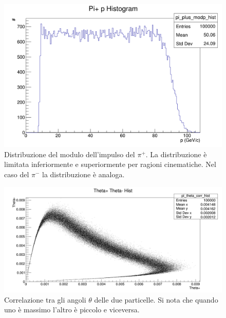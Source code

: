 \documentclass[8pt]{extarticle}
\begin{document}
\begin{figure}
	\begin{center}
		\includegraphics[scale=0.3]{gen_p} 
		\caption{Distribuzione del modulo dell'impulso del $\pi^+$. La distribuzione è limitata inferiormente e superiormente per ragioni cinematiche. Nel caso del $\pi^-$ la distribuzione è analoga.}
		\label{fig:gen_p}
	\end{center}
\end{figure}

\begin{figure}
	\begin{center}
		\includegraphics[scale=0.3]{gen_thetatheta} 
		\caption{Correlazione tra gli angoli $\theta$ delle due particelle. Si nota che quando uno è massimo l'altro è piccolo e viceversa.}
		\label{fig:gen_thetatheta}
	\end{center}
\end{figure}
\end{document}
